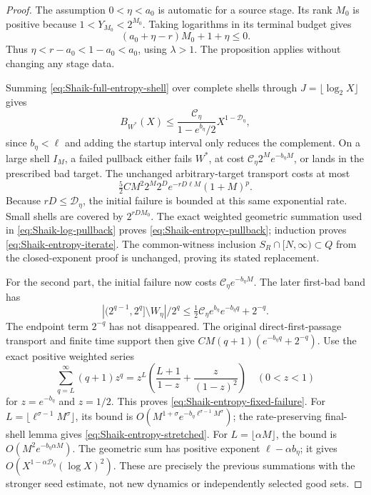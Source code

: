 \begin{proof}
The assumption \(0<\eta<a_0\) is automatic for a source stage.
Its rank \(M_0\) is positive because \(1<Y_{M_0}<2^{M_0}\).
Taking logarithms in its terminal budget gives
\[
 (a_0+\eta-r)M_0+1+\eta\le0 .
\]
Thus \(\eta<r-a_0<1-a_0<a_0\), using \(\lambda>1\).
The proposition applies without changing any stage data.

Summing \eqref{eq:Shaik-full-entropy-shell} over complete shells
through \(J=\lfloor\log_2X\rfloor\) gives
\[
 B_{W^*}(X)\le
 \frac{\mathcal C_\eta}{1-e^{b_\eta}/2}
    X^{1-\mathcal D_\eta},
\]
since \(b_\eta<\ell\) and adding the startup interval only reduces
the complement. On a large shell \(I_M\), a failed pullback either
fails \(W^*\), at cost
\(\mathcal C_\eta2^Me^{-b_\eta M}\), or lands in the prescribed
bad target. The unchanged arbitrary-target transport costs at most
\[
 \tfrac52 C M^2 2^M
       2^D e^{-rD\ell M}(1+M)^p .
\]
Because \(rD\le\mathcal D_\eta\), the initial failure is bounded at
this same exponential rate. Small shells are covered by
\(2^{rDM_0}\). The exact weighted geometric summation used in
\eqref{eq:Shaik-log-pullback} proves
\eqref{eq:Shaik-entropy-pullback}; induction proves
\eqref{eq:Shaik-entropy-iterate}. The common-witness inclusion
\(S_R\cap[N,\infty)\subset Q\) from the closed-exponent proof is
unchanged, proving its stated replacement.

For the second part, the initial failure now costs
\(\mathcal C_\eta e^{-b_\eta M}\). The later first-bad band has
\[
 |(2^{q-1},2^q]\setminus W_\eta|/2^q
 \le \tfrac12\mathcal C_\eta e^{b_\eta}e^{-b_\eta q}+2^{-q}.
\]
The endpoint term \(2^{-q}\) has not disappeared.
The original direct-first-passage transport and finite time support
then give
\(CM(q+1)(e^{-b_\eta q}+2^{-q})\).
Use the exact positive weighted series
\[
 \sum_{q=L}^\infty(q+1)z^q
   =z^L\left(\frac{L+1}{1-z}+\frac{z}{(1-z)^2}\right)
 \quad(0<z<1)
\]
for \(z=e^{-b_\eta}\) and \(z=1/2\).
This proves \eqref{eq:Shaik-entropy-fixed-failure}.
For \(L=\lfloor\ell^{\sigma-1}M^\sigma\rfloor\), its bound is
\(O(M^{1+\sigma}e^{-b_\eta\ell^{\sigma-1}M^\sigma})\);
the rate-preserving final-shell lemma gives
\eqref{eq:Shaik-entropy-stretched}.
For \(L=\lfloor\alpha M\rfloor\), the bound is
\(O(M^2e^{-b_\eta\alpha M})\).
The geometric sum has positive exponent \(\ell-\alpha b_\eta\);
it gives \(O(X^{1-\alpha\mathcal D_\eta}(\log X)^2)\).
These are precisely the previous summations with the stronger
seed estimate, not new dynamics or independently selected good sets.
\end{proof}

